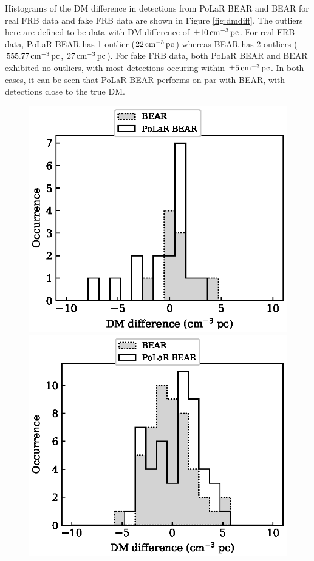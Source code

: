 Histograms of the DM difference in detections from PoLaR BEAR and BEAR for real FRB data and fake FRB data are shown in Figure \ref{fig:dmdiff}. The outliers here are defined to be data with DM difference of $\pm 10 \,\text{cm}^{-3}\,\text{pc}$. For real FRB data, PoLaR BEAR has 1 outlier ($22 \,\text{cm}^{-3}\,\text{pc}$) whereas BEAR has 2 outliers ($555.77 \,\text{cm}^{-3}\,\text{pc}$, $27 \,\text{cm}^{-3}\,\text{pc}$). For fake FRB data, both PoLaR BEAR and BEAR exhibited no outliers, with most detections occuring within $\pm 5 \,\text{cm}^{-3}\,\text{pc}$. In both cases, it can be seen that PoLaR BEAR performs on par with BEAR, with detections close to the true DM. 

\begin{figure}
    \centering
    \begin{minipage}{0.5\textwidth}
        \includegraphics[width=\textwidth]{Graphs/frbdmdiff.eps}
    \end{minipage}%
    \begin{minipage}{0.5\textwidth}
        \includegraphics[width=\textwidth]{Graphs/fakedmdiff.eps}

\end{minipage}
\end{figure}
